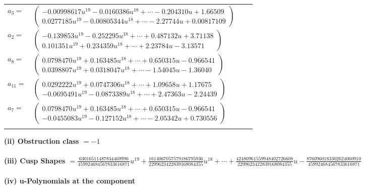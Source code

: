 \documentclass[1p]{elsarticle_modified}
\theoremstyle{definition}
\begin{document}
\begin{tabular}{m{7pt} m{180pt} m{7pt} m{180pt} }
\flushright $a_{3}=$&$\begin{pmatrix}-0.00998617 u^{19}-0.0160386 u^{18}+\cdots-0.204310 u+1.66509\\0.0277185 u^{19}-0.00805344 u^{18}+\cdots-2.27744 u+0.00817109\end{pmatrix}$ \\
\flushright $a_{2}=$&$\begin{pmatrix}-0.139853 u^{19}-0.252295 u^{18}+\cdots+0.487132 u+3.71138\\0.101351 u^{19}+0.234359 u^{18}+\cdots+2.23784 u-3.13571\end{pmatrix}$ \\
\flushright $a_{8}=$&$\begin{pmatrix}0.0798470 u^{19}+0.163485 u^{18}+\cdots+0.650315 u-0.966541\\0.0398807 u^{19}+0.0318047 u^{18}+\cdots-1.54045 u-1.36040\end{pmatrix}$ \\
\flushright $a_{11}=$&$\begin{pmatrix}0.0292222 u^{19}+0.0747306 u^{18}+\cdots+1.09658 u+1.17675\\-0.0695491 u^{19}-0.0873389 u^{18}+\cdots+2.47363 u-2.24439\end{pmatrix}$ \\
\flushright $a_{7}=$&$\begin{pmatrix}0.0798470 u^{19}+0.163485 u^{18}+\cdots+0.650315 u-0.966541\\-0.0455083 u^{19}-0.127152 u^{18}+\cdots-2.05342 u+0.730556\end{pmatrix}$\\&\end{tabular}
\flushleft \textbf{(ii) Obstruction class $= -1$}\\~\\
\flushleft \textbf{(iii) Cusp Shapes $= \frac{63016511487834469996}{459924684567833616871} u^{19}+\frac{1614067057579186795936}{2299623422839168084355} u^{18}+\cdots+\frac{42480961559948402726608}{2299623422839168084355} u-\frac{8760960183302624060910}{459924684567833616871}$}\\~\\
\newpage\renewcommand{\arraystretch}{1}
\flushleft \textbf{(iv) u-Polynomials at the component}\newline \\
\end{document}
